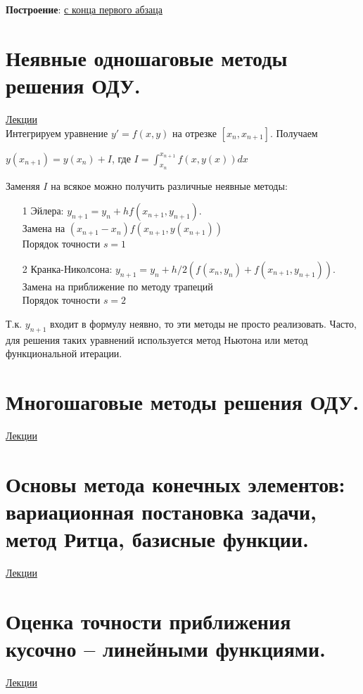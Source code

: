 \documentclass[specialist, subf, href, colorlinks=true, 12pt, times, mtpro, final]{disser}
\theoremstyle{definition}
\begin{document}
	\textbf{Построение}: \hyperlink {lects.89}{с конца первого абзаца}\\

\section {Неявные одношаговые методы решения ОДУ.}
	\hyperlink {lects.91}{Лекции}\\
	Интегрируем уравнение $y' = f (x,y)$ на отрезке $[x_n, x_{n+1}]$. Получаем
	\begin{center}
	$y(x_{n+1}) = y (x_n) + I$, где $I = \int^{x_{n+1}}_{x_n} f(x,y(x))dx$
	\end{center}
	Заменяя $I$ на всякое можно получить различные неявные методы:
	\begin{itemize}
	\item[1] Эйлера: $y_{n+1} = y_n + hf(x_{n+1}, y_{n+1})$. \\
	Замена на $(x_{n+1}-x_n)f(x_{n+1}, y(x_{n+1}))$\\
	Порядок точности $s=1$\\
	
	
	\item[2] Кранка-Николсона: $y_{n+1} = y_n + h/2(f(x_n,y_n) + f(x_{n+1}, y_{n+1}))$. \\
	Замена на приближение по методу трапеций\\
	Порядок точности $s=2$\\
	
	\end{itemize}
	
	Т.к. $y_{n+1}$ входит в формулу неявно, то эти методы не просто реализовать.  Часто, для решения таких уравнений используется метод Ньютона или метод функциональной итерации.
	

\section {Многошаговые методы решения ОДУ.}
	\hyperlink {lects.92}{Лекции}\\

\section {Основы метода конечных элементов: вариационная постановка задачи, метод Ритца, базисные функции.}
	\hyperlink {lects.97}{Лекции}\\

\section {Оценка точности приближения кусочно -- линейными функциями.}
	\hyperlink {lects.102}{Лекции}\\
\end{document}
